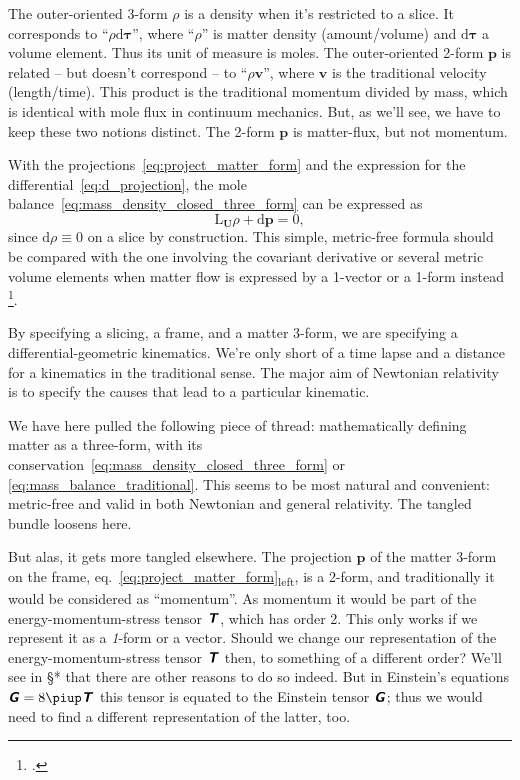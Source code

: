 \documentclass[\ifafour a4paper,12pt,\else a5paper,10pt,\fi%
onecolumn,oneside,article,%
british%
]{memoir}
\theoremstyle{remark}
\theoremstyle{innote}
\newcommand*{\mathte}[1]{\textbf{\textit{\textsf{#1}}}}
\newcommand*{\citep}{\footcites}%
\newcommand*{\pu}{\piup}%
\newcommand*{\di}{\mathrm{d}}%
\renewcommand*{\|}{\nonscript\,\vert\nonscript\;\mathopen{}}
\newcommand*{\sect}{\S}%
\newcommand*{\eqn}{eq.}%
\newcommand*{\eg}{{e.g.}}
\newcommand*{\Li}{\mathrm{L}}
\newcommand*{\ydd}{\rho}
\newcommand*{\yd}{\ydd}
\newcommand*{\yjj}{p}
\newcommand*{\yj}{\bm{\yjj}}
\newcommand*{\yGG}{G}
\newcommand*{\yG}{\mathte{\yGG}}
\newcommand*{\yTTf}{T}
\newcommand*{\yTf}{\mathte{\yTTf}}
\newcommand*{\yFF}{U}
\newcommand*{\yF}{\bm{\yFF}}
\begin{document}
The outer-oriented 3-form $\yd$ is a density when it's restricted to a
slice. It corresponds to \enquote{$\rho\di\bm{\tau}$}, where
\enquote{$\rho$} is matter density (amount/volume) and {$\di\bm{\tau}$} a
volume element. Thus its unit of measure is moles. The outer-oriented
2-form $\yj$ is related -- but doesn't correspond -- to
\enquote{$\rho\bm{v}$}, where {$\bm{v}$} is the traditional velocity
(length/time). This product is the traditional momentum divided by mass,
which is identical with mole flux in continuum mechanics. But, as we'll
see, we have to keep these two notions distinct. The 2-form $\yj$ is
matter-flux, but not momentum.

With the projections~\eqref{eq:project_matter_form} and the expression for
the differential~\eqref{eq:d_projection}, the mole
balance~\eqref{eq:mass_density_closed_three_form} can be expressed as
\begin{equation}
  \label{eq:mass_balance_traditional}
  \Li_{\yF}\yd + \di\yj = 0,
\end{equation}
since $\di\yd\equiv 0$ on a slice by construction. This simple, metric-free
formula should be compared with the one involving the covariant derivative
or several metric volume elements when matter flow is expressed by a
1-vector or a 1-form instead \citep[\eg][\eqn~(7.205), \sect~7.3,
p.~361]{rezzollaetal2013}[\eqn~(6.47), \sect~6.3.2,
p.~110]{gourgoulhon2007_r2012}.

By specifying a slicing, a frame, and a matter 3-form, we are specifying a
differential-geometric kinematics. We're only short of a time lapse and a
distance for a kinematics in the traditional sense. The major aim of
Newtonian relativity is to specify the causes that lead to a particular
kinematic.

\medskip

We have here pulled the following piece of thread: mathematically defining
matter as a three-form, with its
conservation~\eqref{eq:mass_density_closed_three_form} or
\eqref{eq:mass_balance_traditional}. This seems to be most natural and
convenient: metric-free and valid in both Newtonian and general relativity.
The tangled bundle loosens here.

But alas, it gets more tangled elsewhere. The projection $\yj$ of the
matter 3-form on the frame,
\eqn~\eqref{eq:project_matter_form}\textsubscript{left}, is a 2-form, and
traditionally it would be considered as \enquote{momentum}. As momentum it
would be part of the energy-momentum-stress tensor $\yTf$, which has order
2. This only works if we represent it as a \emph{1}-form or a vector.
Should we change our representation of the energy-momentum-stress tensor
$\yTf$ then, to something of a different order? We'll see in \sect** that
there are other reasons to do so indeed. But in Einstein's equations
$\yG = 8\pu\yTf$ this tensor is equated to the Einstein tensor $\yG$; thus
we would need to find a different representation of the latter, too.
\end{document}
